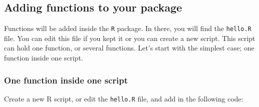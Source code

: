 \documentclass[
]{article}
\begin{document}
\hypertarget{adding-functions-to-your-package}{%
\subsection{Adding functions to your package}\label{adding-functions-to-your-package}}

Functions will be added inside the \texttt{R} package. In there, you will find the \texttt{hello.R} file. You can
edit this file if you kept it or you can create a new script. This script can hold one function, or
several functions.
Let's start with the simplest case; one function inside one script.

\hypertarget{one-function-inside-one-script}{%
\subsubsection{One function inside one script}\label{one-function-inside-one-script}}

Create a new R script, or edit the \texttt{hello.R} file, and add in the following code:
\end{document}
